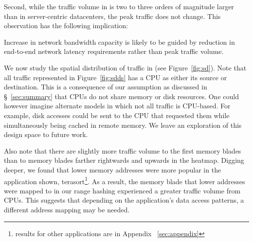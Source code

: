 Second, while the traffic volume in \dis is two to three orders of magnitude larger than in server-centric datacenters, the peak traffic does not change. This observation has the following implication:

 Increase in \dis network bandwidth capacity is likely to be guided by reduction in end-to-end network latency requirements rather than peak traffic volume.


We now study the spatial distribution of traffic in \dis (see Figure~\ref{fig:sd}). Note that all traffic represented in Figure~\ref{fig:sdds} has a CPU as either its source or destination. This is a consequence of our assumption as discussed in \S~\ref{sec:summary} that CPUs do not share memory or disk resources. One could however imagine alternate models in which not all traffic is CPU-based. For example, disk accesses could be sent to the CPU that requested them while simultaneously being cached in remote memory. We leave an exploration of this design space to future work.

Also note that there are slightly more traffic volume to the first memory blades than to memory blades farther rightwards and upwards in the heatmap. Digging deeper, we found that lower memory addresses were more popular in the application shown, terasort\footnote{results for other applications are in Appendix ~\ref{sec:appendix}}. As a result, the memory blade that lower addresses were mapped to in our range hashing experienced a greater traffic volume from CPUs. This suggests that depending on the application's data access patterns, a different address mapping may be needed. 

